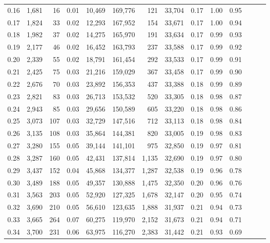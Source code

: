 \begin{tabular}{rrrrrrrrrrrrrr}
0.16 &  1,681 &   16 &  0.01 &   10,469 &  169,776 &     121 &  33,704 &  0.17 &  1.00 &      0.95 \\
0.17 &  1,824 &   33 &  0.02 &   12,293 &  167,952 &     154 &  33,671 &  0.17 &  1.00 &      0.94 \\
0.18 &  1,982 &   37 &  0.02 &   14,275 &  165,970 &     191 &  33,634 &  0.17 &  0.99 &      0.93 \\
0.19 &  2,177 &   46 &  0.02 &   16,452 &  163,793 &     237 &  33,588 &  0.17 &  0.99 &      0.92 \\
0.20 &  2,339 &   55 &  0.02 &   18,791 &  161,454 &     292 &  33,533 &  0.17 &  0.99 &      0.91 \\
0.21 &  2,425 &   75 &  0.03 &   21,216 &  159,029 &     367 &  33,458 &  0.17 &  0.99 &      0.90 \\
0.22 &  2,676 &   70 &  0.03 &   23,892 &  156,353 &     437 &  33,388 &  0.18 &  0.99 &      0.89 \\
0.23 &  2,821 &   83 &  0.03 &   26,713 &  153,532 &     520 &  33,305 &  0.18 &  0.98 &      0.87 \\
0.24 &  2,943 &   85 &  0.03 &   29,656 &  150,589 &     605 &  33,220 &  0.18 &  0.98 &      0.86 \\
0.25 &  3,073 &  107 &  0.03 &   32,729 &  147,516 &     712 &  33,113 &  0.18 &  0.98 &      0.84 \\
0.26 &  3,135 &  108 &  0.03 &   35,864 &  144,381 &     820 &  33,005 &  0.19 &  0.98 &      0.83 \\
0.27 &  3,280 &  155 &  0.05 &   39,144 &  141,101 &     975 &  32,850 &  0.19 &  0.97 &      0.81 \\
0.28 &  3,287 &  160 &  0.05 &   42,431 &  137,814 &   1,135 &  32,690 &  0.19 &  0.97 &      0.80 \\
0.29 &  3,437 &  152 &  0.04 &   45,868 &  134,377 &   1,287 &  32,538 &  0.19 &  0.96 &      0.78 \\
0.30 &  3,489 &  188 &  0.05 &   49,357 &  130,888 &   1,475 &  32,350 &  0.20 &  0.96 &      0.76 \\
0.31 &  3,563 &  203 &  0.05 &   52,920 &  127,325 &   1,678 &  32,147 &  0.20 &  0.95 &      0.74 \\
0.32 &  3,690 &  210 &  0.05 &   56,610 &  123,635 &   1,888 &  31,937 &  0.21 &  0.94 &      0.73 \\
0.33 &  3,665 &  264 &  0.07 &   60,275 &  119,970 &   2,152 &  31,673 &  0.21 &  0.94 &      0.71 \\
0.34 &  3,700 &  231 &  0.06 &   63,975 &  116,270 &   2,383 &  31,442 &  0.21 &  0.93 &      0.69 \\

\end{tabular}
